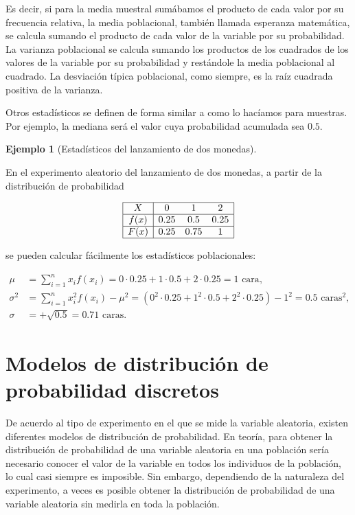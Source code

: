 \documentclass[
  spanish,
  a4paper,
]{scrreport}
\theoremstyle{plain}
\theoremstyle{definition}
\newtheorem{example}{Ejemplo}[chapter]
\theoremstyle{definition}
\theoremstyle{remark}
\begin{document}
Es decir, si para la media muestral sumábamos el producto de cada valor
por su frecuencia relativa, la media poblacional, también llamada
esperanza matemática, se calcula sumando el producto de cada valor de la
variable por su probabilidad. La varianza poblacional se calcula sumando
los productos de los cuadrados de los valores de la variable por su
probabilidad y restándole la media poblacional al cuadrado. La
desviación típica poblacional, como siempre, es la raíz cuadrada
positiva de la varianza.

Otros estadísticos se definen de forma similar a como lo hacíamos para
muestras. Por ejemplo, la mediana será el valor cuya probabilidad
acumulada sea \(0.5\).

\begin{example}[Estadísticos del lanzamiento de dos
monedas]\protect\hypertarget{exm-estadisticos-dos-monedas}{}\label{exm-estadisticos-dos-monedas}

En el experimento aleatorio del lanzamiento de dos monedas, a partir de
la distribución de probabilidad

\[
\begin{array}{|c|ccc|}
\hline
X & 0 & 1 & 2\\ \hline
f(x) & 0.25 & 0.5 & 0.25\\
\hline
F(x) & 0.25 & 0.75 & 1 \\
\hline
\end{array}
\]

se pueden calcular fácilmente los estadísticos poblacionales:

\[
\begin{aligned}
\mu &= \sum_{i=1}^n x_i f(x_i) = 0\cdot 0.25 + 1\cdot 0.5 + 2\cdot 0.25 = 1 \mbox{ cara},\\
\sigma^2 &= \sum_{i=1}^n x_i^2 f(x_i) -\mu^2 = (0^2\cdot 0.25 + 1^2\cdot 0.5 + 2^2\cdot 0.25) - 1^2 = 0.5 \mbox{ caras}^2,\\
\sigma &= +\sqrt{0.5} = 0.71 \mbox{ caras}.
\end{aligned}
\]

\end{example}

\section{Modelos de distribución de probabilidad
discretos}\label{modelos-de-distribuciuxf3n-de-probabilidad-discretos}

De acuerdo al tipo de experimento en el que se mide la variable
aleatoria, existen diferentes modelos de distribución de probabilidad.
En teoría, para obtener la distribución de probabilidad de una variable
aleatoria en una población sería necesario conocer el valor de la
variable en todos los individuos de la población, lo cual casi siempre
es imposible. Sin embargo, dependiendo de la naturaleza del experimento,
a veces es posible obtener la distribución de probabilidad de una
variable aleatoria sin medirla en toda la población.
\end{document}
